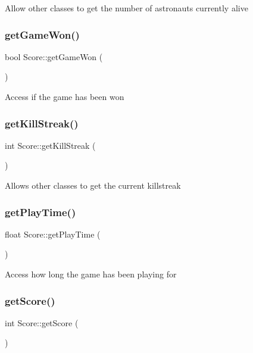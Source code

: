 Allow other classes to get the number of astronauts currently alive \mbox{\label{class_score_a4004909c5ca1ac466d55d32c5f6a30fd}} 
\subsubsection{\texorpdfstring{get\+Game\+Won()}{getGameWon()}}
{\footnotesize\ttfamily bool Score\+::get\+Game\+Won (\begin{DoxyParamCaption}{ }\end{DoxyParamCaption})}

Access if the game has been won \mbox{\label{class_score_a3bd9796efe8e7cf9bb1c97597e56bc01}} 
\subsubsection{\texorpdfstring{get\+Kill\+Streak()}{getKillStreak()}}
{\footnotesize\ttfamily int Score\+::get\+Kill\+Streak (\begin{DoxyParamCaption}{ }\end{DoxyParamCaption})}

Allows other classes to get the current killstreak \mbox{\label{class_score_ae4fc66274baac2f13975f6139681b52c}} 
\subsubsection{\texorpdfstring{get\+Play\+Time()}{getPlayTime()}}
{\footnotesize\ttfamily float Score\+::get\+Play\+Time (\begin{DoxyParamCaption}{ }\end{DoxyParamCaption})}

Access how long the game has been playing for \mbox{\label{class_score_a8627c93270c188a3fd28a25b1d07a9e7}} 
\subsubsection{\texorpdfstring{get\+Score()}{getScore()}}
{\footnotesize\ttfamily int Score\+::get\+Score (\begin{DoxyParamCaption}{ }\end{DoxyParamCaption})}

